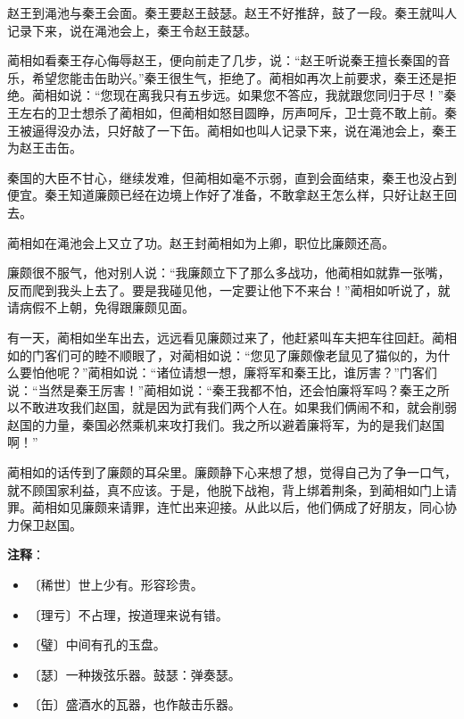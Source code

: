 \documentclass[12pt,UTF-8,openany]{ctexbook}
\begin{document}
\begin{Large}
    赵王到渑池与秦王会面。秦王要赵王鼓瑟。赵王不好推辞，鼓了一段。秦王就叫人记录下来，说在渑池会上，秦王令赵王鼓瑟。
    
    蔺相如看秦王存心侮辱赵王，便向前走了几步，说：“赵王听说秦王擅长秦国的音乐，希望您能击缶助兴。”秦王很生气，拒绝了。蔺相如再次上前要求，秦王还是拒绝。蔺相如说：“您现在离我只有五步远。如果您不答应，我就跟您同归于尽！”秦王左右的卫士想杀了蔺相如，但蔺相如怒目圆睁，厉声呵斥，卫士竟不敢上前。秦王被逼得没办法，只好敲了一下缶。蔺相如也叫人记录下来，说在渑池会上，秦王为赵王击缶。
    
    秦国的大臣不甘心，继续发难，但蔺相如毫不示弱，直到会面结束，秦王也没占到便宜。秦王知道廉颇已经在边境上作好了准备，不敢拿赵王怎么样，只好让赵王回去。
    
    蔺相如在渑池会上又立了功。赵王封蔺相如为上卿，职位比廉颇还高。
    
    廉颇很不服气，他对别人说：“我廉颇立下了那么多战功，他蔺相如就靠一张嘴，反而爬到我头上去了。要是我碰见他，一定要让他下不来台！”蔺相如听说了，就请病假不上朝，免得跟廉颇见面。
    
    有一天，蔺相如坐车出去，远远看见廉颇过来了，他赶紧叫车夫把车往回赶。蔺相如的门客们可的睦不顺眼了，对蔺相如说：“您见了廉颇像老鼠见了猫似的，为什么要怕他呢？”蔺相如说：“诸位请想一想，廉将军和秦王比，谁厉害？”门客们说：“当然是秦王厉害！”蔺相如说：“秦王我都不怕，还会怕廉将军吗？秦王之所以不敢进攻我们赵国，就是因为武有我们两个人在。如果我们俩闹不和，就会削弱赵国的力量，秦国必然乘机来攻打我们。我之所以避着廉将军，为的是我们赵国啊！”
    
    蔺相如的话传到了廉颇的耳朵里。廉颇静下心来想了想，觉得自己为了争一口气，就不顾国家利益，真不应该。于是，他脱下战袍，背上绑着荆条，到蔺相如门上请罪。蔺相如见廉颇来请罪，连忙出来迎接。从此以后，他们俩成了好朋友，同心协力保卫赵国。
    
\end{Large}


\newpage

\textbf{注释}：

\vspace{-1em}

\begin{itemize}
    \setlength\itemsep{-0.2em}
    \item 〔稀世〕世上少有。形容珍贵。
    \item 〔理亏〕不占理，按道理来说有错。
    \item 〔璧〕中间有孔的玉盘。
    \item 〔瑟〕一种拨弦乐器。鼓瑟：弹奏瑟。
    \item 〔缶〕盛酒水的瓦器，也作敲击乐器。
\end{itemize}
\end{document}
